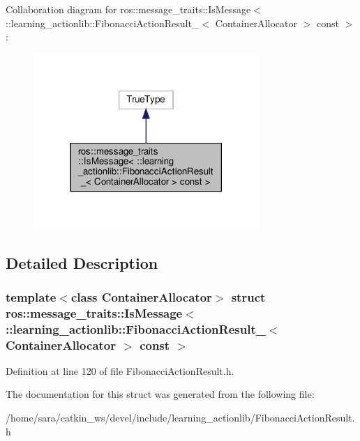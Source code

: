 Collaboration diagram for ros\+:\+:message\+\_\+traits\+:\+:Is\+Message$<$ \+:\+:learning\+\_\+actionlib\+:\+:Fibonacci\+Action\+Result\+\_\+$<$ Container\+Allocator $>$ const $>$\+:
\nopagebreak
\begin{figure}[H]
\begin{center}
\leavevmode
\includegraphics[width=242pt]{structros_1_1message__traits_1_1IsMessage_3_01_1_1learning__actionlib_1_1FibonacciActionResult__663bc81857202c03ccd3b6cc6e8fa233}
\end{center}
\end{figure}


\subsection{Detailed Description}
\subsubsection*{template$<$class Container\+Allocator$>$\newline
struct ros\+::message\+\_\+traits\+::\+Is\+Message$<$ \+::learning\+\_\+actionlib\+::\+Fibonacci\+Action\+Result\+\_\+$<$ Container\+Allocator $>$ const $>$}



Definition at line 120 of file Fibonacci\+Action\+Result.\+h.



The documentation for this struct was generated from the following file\+:\begin{DoxyCompactItemize}
\item 
/home/sara/catkin\+\_\+ws/devel/include/learning\+\_\+actionlib/Fibonacci\+Action\+Result.\+h\end{DoxyCompactItemize}
